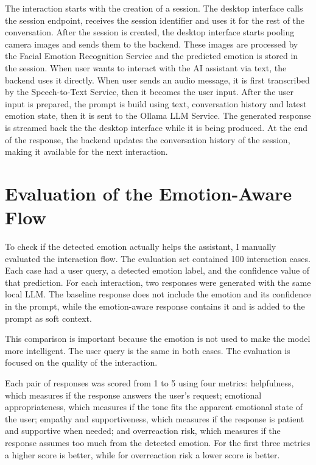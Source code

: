 The interaction starts with the creation of a session. The desktop interface calls the session endpoint, receives the session identifier and uses it for the rest of the conversation. After the session is created, the desktop interface starts pooling camera images and sends them to the backend. These images are processed by the Facial Emotion Recognition Service and the predicted emotion is stored in the session. When user wants to interact with the AI assistant via text, the backend uses it directly. When user sends an audio message, it is first transcribed by the  Speech-to-Text Service, then it becomes the user input. After the user input is prepared, the prompt is build using text, conversation history and latest emotion state, then it is sent to the Ollama LLM Service. The generated response is streamed back the the desktop interface while it is being produced. At the end of the response, the backend updates the conversation history of the session, making it available for the next interaction.

\section{Evaluation of the Emotion-Aware Flow}

To check if the detected emotion actually helps the assistant, I manually evaluated the interaction flow. The evaluation set contained 100 interaction cases. Each case had a user query, a detected emotion label, and the confidence value of that prediction. For each interaction, two responses were generated with the same local LLM. The baseline response does not include the emotion and its confidence in the prompt, while the emotion-aware response contains it and is added to the prompt as soft context.

This comparison is important because the emotion is not used to make the model more intelligent. The user query is the same in both cases. The evaluation is focused on the quality of the interaction.

Each pair of responses was scored from 1 to 5 using four metrics: helpfulness, which measures if the response answers the user's request; emotional appropriateness, which measures if the tone fits the apparent emotional state of the user; empathy and supportiveness, which measures if the response is patient and supportive when needed; and overreaction risk, which measures if the response assumes too much from the detected emotion. For the first three metrics a higher score is better, while for overreaction risk a lower score is better.

